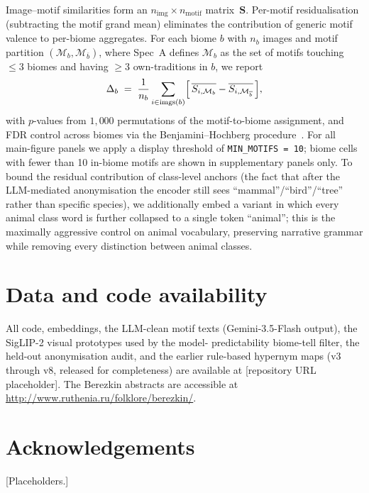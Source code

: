 \documentclass[11pt,a4paper]{article}
\begin{document}
Image--motif similarities form an
$n_{\text{img}} \times n_{\text{motif}}$ matrix~$\mathbf{S}$.
Per-motif residualisation (subtracting the motif grand mean)
eliminates the contribution of generic motif valence to per-biome
aggregates. For each biome $b$ with $n_b$ images and motif partition
$(\mathcal{M}_b, \mathcal{M}_{\overline{b}})$, where Spec~A defines
$\mathcal{M}_b$ as the set of motifs touching $\leq 3$ biomes and
having $\geq 3$ own-traditions in $b$, we report
\[
\Delta_b \;=\; \frac{1}{n_b}\sum_{i \in \text{imgs}(b)}
        \Bigl[\,\overline{S_{i,\mathcal{M}_b}}
            - \overline{S_{i,\mathcal{M}_{\overline{b}}}}\,\Bigr],
\]
with $p$-values from $1{,}000$ permutations of the motif-to-biome
assignment, and FDR control across biomes via the
Benjamini--Hochberg procedure~\citep{benjamini1995controlling}. For
all main-figure panels we apply a display threshold of
\texttt{MIN\_MOTIFS = 10}; biome cells with fewer than 10 in-biome
motifs are shown in supplementary panels only. To bound the
residual contribution of class-level anchors (the fact that after
the LLM-mediated anonymisation the encoder still sees
``mammal''/``bird''/``tree'' rather than specific species), we
additionally embed a variant in which every animal class word is
further collapsed to a single token ``animal''; this is the
maximally aggressive control on animal vocabulary, preserving
narrative grammar while removing every distinction between
animal classes.

\section*{Data and code availability}
All code, embeddings, the LLM-clean motif texts (Gemini-3.5-Flash
output), the SigLIP-2 visual prototypes used by the model-
predictability biome-tell filter, the held-out anonymisation
audit, and the earlier rule-based hypernym maps (v3 through v8,
released for completeness) are available at [repository URL
placeholder]. The Berezkin abstracts are
accessible at \url{http://www.ruthenia.ru/folklore/berezkin/}.

\section*{Acknowledgements}
[Placeholders.]


\end{document}
